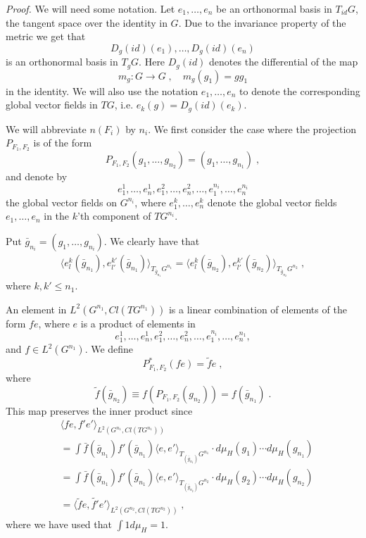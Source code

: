 \documentclass[12pt]{article}
\newcommand{\ba}{\begin{eqnarray}}
\newcommand{\ea}{\end{eqnarray}}
\begin{document}
\textit{Proof.} We will need some notation. Let $e_1,\ldots , e_n$ be an
orthonormal basis in $T_{id}G$, the tangent space over the identity in
$G$. Due to the invariance property of the metric we get that $$D_g(id)
(e_1),\ldots , D_g(id)(e_n)$$ is an orthonormal basis in $T_gG$. Here
$D_g(id)$ denotes the differential of the map 
\[
m_g:G\to G\;,\quad m_g(g_1)= g g_1
\]
in the identity. We will also use the notation $e_1,\ldots, e_n$ to denote the corresponding global vector fields in $TG$, i.e. $e_k(g)=D_g(id)(e_k)$.



We will abbreviate $n(F_i)$ by $n_i$. We first consider the case where the projection $P_{F_1,F_2}$ is of the form 
\begin{equation}\label{strucaf1} P_{F_1,F_2} (g_1,\ldots ,g_{n_2})= (g_1,\ldots , g_{n_1})\;,
\end{equation}
and denote by 
$$e_1^1,\ldots , e_n^1,e_1^2, \ldots , e_n^2, \ldots ,e_1^{n_i}, \ldots , e_n^{n_i}$$  
the global vector fields on $G^{n_i}$, where $e_1^k , \ldots , e_n^k$ denote the global vector fields $e_1,\ldots , e_n$ in the $k$'th component of $TG^{n_i}$.  

Put $\bar{g}_{n_i}=(g_1, \ldots , g_{n_i})$. We clearly have that 
\ba
\langle e_l^k (\bar{g}_{n_1}),e_{l'}^{k'} (\bar{g}_{n_1})\rangle_{T_{\bar{g}_{n_1}}G^{n_1}}
=\langle e_l^k (\bar{g}_{n_2}),e_{l'}^{k'} (\bar{g}_{n_2})\rangle_{T_{\bar{g}_{n_2}}G^{n_2}}\;, 
\nonumber
\ea
where $k,k'\leq n_1$.

An element in $L^2(G^{n_1},Cl(TG^{n_1}))$ is a linear combination of elements of the form $fe$, where $e$ is a product of elements in 
$$e_1^1,\ldots , e_n^1,e_1^2, \ldots , e_n^2, \ldots ,e_1^{n_i}, \ldots , e_n^{n_1},$$
and $f \in L^2(G^{n_1})$. We define 
$$P_{F_1,F_2}^*(fe)=\tilde{f}e\;,$$
where 
\[
\tilde{f}(\bar{g}_{n_2})\equiv f(P_{F_1,F_2}(g_{n_2}))=f(\bar{g}_{n_1})\;.  
\]
This map preserves the inner product since
\begin{eqnarray*}
& \langle fe ,f'e'\rangle_{L^2(G^{n_1},Cl(TG^{n_1}))}\\
&= \int \bar{f}(\bar{g}_{n_1})f'(\bar{g}_{n_1}) 
\langle e,e'\rangle_{T_{(\bar{g}_{n_1})}G^{n_1}}\cdot 
d\mu_H(g_1)\cdots d\mu_H(g_{n_1}) 
\\
&= \int \bar{f}(\bar{g}_{n_1})f'(\bar{g}_{n_1}) 
\langle e,e'\rangle_{T_{(\bar{g}_{n_2})}G^{n_2}}\cdot 
d\mu_H(g_2)\cdots d\mu_H(g_{n_2}) \\
&=  \langle \tilde{f}e ,\tilde{f'}e'\rangle_{L^2(G^{n_2},Cl(TG^{n_2}))}\;,
\end{eqnarray*}
where we have used that $\int 1d\mu_H=1$.
\end{document}
